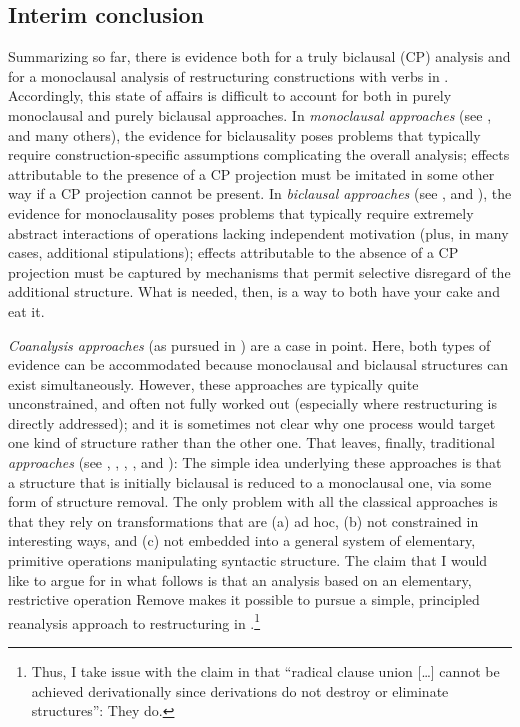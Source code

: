 \documentclass[output=paper]{langsci/langscibook}
\begin{document}
\subsection{Interim conclusion}

Summarizing so far, there is evidence both for a truly biclausal (CP) analysis
and for a monoclausal analysis of restructuring constructions with
 verbs in . Accordingly, this state of affairs is
difficult to account for both in purely monoclausal and purely biclausal
approaches. In {\itshape monoclausal approaches} (see
\citealt{Geilfuss:88,Haider:93,Haider:10,Kiss:95,Wurmbrand:01,Wurmbrand:07,Wurmbrand:15,Sternefeld:06},
and many others), the evidence for biclausality poses problems that typically
require construction-specific assumptions complicating the overall analysis;
effects attributable to the presence of a CP projection must be imitated in
some other way if a CP projection cannot be present. In {\itshape biclausal
approaches} (see
    \citealt{Baker1988,Sternefeld:90:pro,Mueller&Sternefeld:95,Sabel:96,Roberts:97:res,Hinterhoelzl:99},
    and \cite{Koopman&Szabolcsi:00}), the evidence for monoclausality poses
    problems that typically require extremely abstract interactions of
     operations lacking independent motivation (plus, in many
    cases, additional stipulations); effects attributable to the absence of a
    CP projection must be captured by mechanisms that permit selective
    disregard of the additional structure. What is needed, then, is a way to
    both have your cake and eat it.

{\itshape Coanalysis approaches} (as pursued in
\citealt{Huybregts:82,Bennis:83,Haegeman&Riemsdijk:86,DiSciullo&Williams:87,Sadock:91,Pesetsky:95})
are a case in point. Here, both types of evidence can be accommodated because
monoclausal and biclausal structures can exist simultaneously. However, these
approaches are typically quite unconstrained, and often not fully worked out
(especially where restructuring is directly addressed); and it is sometimes not
clear why one process would target one kind of structure rather than the other
one. That leaves, finally, traditional {\itshape {} approaches} (see
\citealt[Ch.~3]{Ross:67}, \citealt{Evers:75}, \citealt{Rizzi:82},
\citealt{Aissen&Perlmutter:83}, and \citealt{Stechow&Sternefeld:88}): The
simple idea underlying these approaches is that  a structure that is initially
biclausal is reduced to a monoclausal one, via some form of structure removal.
The only problem with all the classical  approaches is that they rely
on transformations that are (a) ad hoc, (b) not constrained in interesting
ways, and (c) not embedded into a general system of elementary, primitive
operations manipulating syntactic structure.  The claim that I would like to
argue for in what follows is that an analysis based on an elementary,
restrictive operation Remove makes it possible to pursue a simple, principled
reanalysis approach to restructuring in .\footnote{Thus, I take issue
    with the claim in \textcite[309]{Haider:10} that ``radical clause union
[\dots] cannot be achieved derivationally since derivations do not destroy or
eliminate structures'': They do.}
\end{document}
